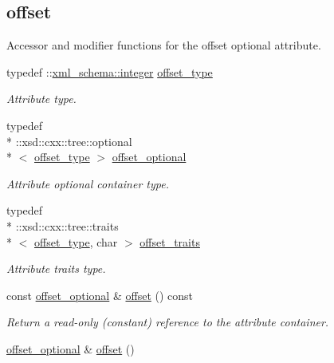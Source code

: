 \subsection*{offset}
\label{_amgrp7a86c157ee9713c34fbd7a1ee40f0c5a}%
Accessor and modifier functions for the offset optional attribute. \begin{DoxyCompactItemize}
\item 
typedef \+::\hyperlink{namespacexml__schema_aaaea7c8ce4dfbe26cc52c91c29c97b7c}{xml\+\_\+schema\+::integer} \hyperlink{classDataArray__t_a7b840c5f08bd2c65cd3c5e24ad132cfb}{offset\+\_\+type}
\begin{DoxyCompactList}\small\item\em Attribute type. \end{DoxyCompactList}\item 
typedef \\*
\+::xsd\+::cxx\+::tree\+::optional\\*
$<$ \hyperlink{classDataArray__t_a7b840c5f08bd2c65cd3c5e24ad132cfb}{offset\+\_\+type} $>$ \hyperlink{classDataArray__t_a4bc33060e7c386b658c752347ac5f03e}{offset\+\_\+optional}
\begin{DoxyCompactList}\small\item\em Attribute optional container type. \end{DoxyCompactList}\item 
typedef \\*
\+::xsd\+::cxx\+::tree\+::traits\\*
$<$ \hyperlink{classDataArray__t_a7b840c5f08bd2c65cd3c5e24ad132cfb}{offset\+\_\+type}, char $>$ \hyperlink{classDataArray__t_a2e3e1a5de665fc64a3d86fd94bb1af0f}{offset\+\_\+traits}
\begin{DoxyCompactList}\small\item\em Attribute traits type. \end{DoxyCompactList}\item 
const \hyperlink{classDataArray__t_a4bc33060e7c386b658c752347ac5f03e}{offset\+\_\+optional} \& \hyperlink{classDataArray__t_a995d24c5c7a88929a6b0e7de154bbdf5}{offset} () const 
\begin{DoxyCompactList}\small\item\em Return a read-\/only (constant) reference to the attribute container. \end{DoxyCompactList}\item 
\hyperlink{classDataArray__t_a4bc33060e7c386b658c752347ac5f03e}{offset\+\_\+optional} \& \hyperlink{classDataArray__t_aed72cbf5f3476360f4898f487a074c26}{offset} ()

\end{DoxyCompactItemize}
